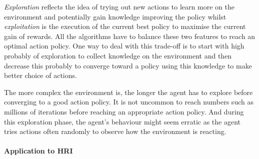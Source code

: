 	\textit{Exploration} reflects the idea of trying out new actions to learn more on the environment and potentially gain knowledge improving the policy whilst \textit{exploitation} is the execution of the current best policy to maximise the current gain of rewards. All the algorithms have to balance these two features to reach an optimal action policy. One way to deal with this trade-off is to start with high probably of exploration to collect knowledge on the environment and then decrease this probably to converge toward a policy using this knowledge to make better choice of actions.
	
	The more complex the environment is, the longer the agent has to explore before converging to a good action policy. It is not uncommon to reach numbers such as millions of iterations before reaching an appropriate action policy. And during this exploration phase, the agent's behaviour might seem erratic as the agent tries actions often randomly to observe how the environment is reacting.
	
	
	\paragraph{Application to HRI}
	
